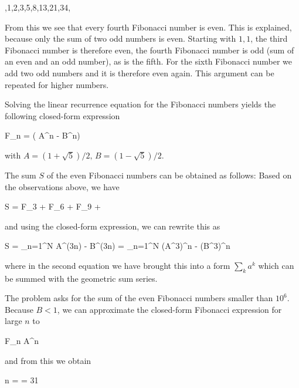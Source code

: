 ,1,2,3,5,8,13,21,34,\cdots
\eee

From this we see that every fourth Fibonacci number is even. This is explained, because only the sum of two odd numbers is even. Starting with $1,1$, the third Fibonacci number is therefore even, the fourth Fibonacci number is odd (sum of an even and an odd number), as is the fifth. For the sixth Fibonacci number we add two odd numbers and it is therefore even again. This argument can be repeated for higher numbers.

Solving the linear recurrence equation for the Fibonacci numbers yields the following closed-form expression

\bee
F_n =  \left( A^n  - B^n\right)
\eee

with $A = (1+\sqrt{5})/2, \, B = (1-\sqrt{5})/2$.

The sum $S$ of the even Fibonacci numbers can be obtained as follows: Based on the observations above, we have

\bee
S = F_3 + F_6 + F_9 + \cdots
\eee

and using the closed-form expression, we can rewrite this as

\bee
S =  \sum_{n=1}^N A^(3n)  - B^(3n) =  \sum_{n=1}^N (A^3)^n  - (B^3)^n
\eee

where in the second equation we have brought this into a form $\sum_k a^k$ which can be summed with the geometric sum series.

The problem asks for the sum of the even Fibonacci numbers smaller than $10^6$. Because $B<1$, we can approximate the closed-form Fibonacci expression for large $n$ to

\bee
F_n \approx {} A^n
\eee

and from this we obtain

\bee
n = \left\lfloor {} \right\rfloor = 31
\eee